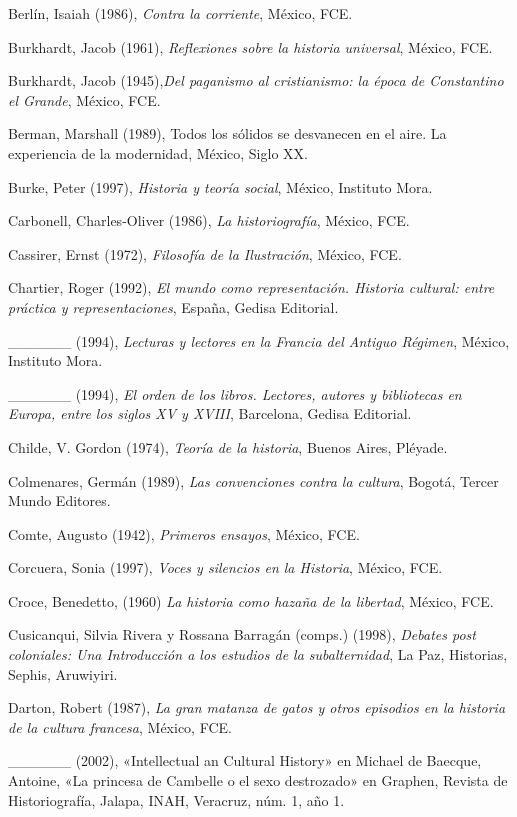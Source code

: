 Berlín, Isaiah (1986), \textit{Contra la corriente}, México, FCE\@.


Burkhardt, Jacob (1961), \textit{Reflexiones sobre la historia universal},
México, FCE\@.


Burkhardt, Jacob (1945),\textit{Del paganismo al cristianismo: la época de
Constantino el Grande}, México, FCE\@.


Berman, Marshall (1989), Todos los sólidos se desvanecen en el aire. La
experiencia de la modernidad, México, Siglo XX\@. 


Burke, Peter (1997), \textit{Historia y teoría social}, México, Instituto Mora.

 
Carbonell, Charles{-}Oliver (1986), \textit{La historiografía}, México, FCE\@. 


Cassirer, Ernst (1972), \textit{ Filosofía de la Ilustración}, México, FCE\@.

Chartier, Roger (1992), \textit{El mundo como representación. Historia
cultural: entre práctica y representaciones}, España, Gedisa Editorial. 


\_\_\_\_\_\_ (1994), \textit{Lecturas y lectores en la Francia del
Antiguo Régimen}, México, Instituto Mora. 

\_\_\_\_\_\_ (1994), \textit{El orden de los libros. Lectores, autores y
bibliotecas en Europa, entre los siglos XV y XVIII}, Barcelona, Gedisa
Editorial. 


Childe, V. Gordon (1974), \textit{Teoría de la historia}, Buenos Aires,
Pléyade. 

Colmenares, Germán (1989), \textit{Las convenciones contra la cultura}, Bogotá,
Tercer Mundo Editores. 


Comte, Augusto (1942), \textit{Primeros ensayos}, México, FCE\@.

Corcuera, Sonia (1997), \textit{Voces y silencios en la Historia}, México,
FCE.

Croce, Benedetto, (1960) \textit{La historia como hazaña de la libertad},
México, FCE\@.

Cusicanqui, Silvia Rivera y Rossana Barragán (comps.) (1998), \textit{Debates post
coloniales: Una Introducción a los estudios de la subalternidad}, La Paz,
Historias, Sephis, Aruwiyiri. 


Darton, Robert (1987), \textit{La gran matanza de gatos y otros episodios en la
historia de la cultura francesa}, México, FCE. 


\_\_\_\_\_\_ (2002), «Intellectual an Cultural History» en Michael de
Baecque, Antoine, «La princesa de Cambelle o el sexo destrozado» en Graphen,
Revista de Historiografía, Jalapa, INAH, Veracruz, núm\@. 1, año 1. 

